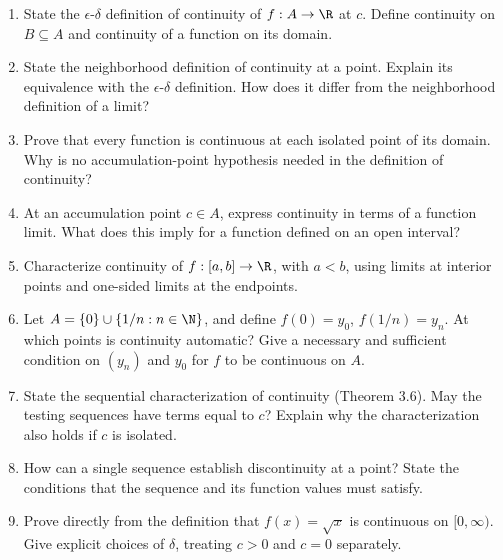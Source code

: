 \begin{enumerate}
  \item State the \(\epsilon\)-\(\delta\) definition of continuity
    of \(f:A\to\R\) at \(c\). Define continuity on \(B\subseteq A\)
    and continuity of a function on its domain.

  \item State the neighborhood definition of continuity at a point.
    Explain its equivalence with the \(\epsilon\)-\(\delta\) definition.
    How does it differ from the neighborhood definition of a limit?

  \item Prove that every function is continuous at each isolated point
    of its domain. Why is no accumulation-point hypothesis needed
    in the definition of continuity?

  \item At an accumulation point \(c\in A\), express continuity in
    terms of a function limit. What does this imply for a function
    defined on an open interval?

  \item Characterize continuity of \(f:[a,b]\to\R\), with \(a<b\),
    using limits at interior points and one-sided limits at the endpoints.

  \item Let \(A=\{0\}\cup\{1/n:n\in\N\}\), and define
    \(f(0)=y_0\), \(f(1/n)=y_n\). At which points is continuity
    automatic? Give a necessary and sufficient condition on \((y_n)\)
    and \(y_0\) for \(f\) to be continuous on \(A\).

  \item State the sequential characterization of continuity
    (Theorem 3.6). May the testing sequences have terms equal to \(c\)?
    Explain why the characterization also holds if \(c\) is isolated.

  \item How can a single sequence establish discontinuity at a point?
    State the conditions that the sequence and its function values
    must satisfy.

  \item Prove directly from the definition that \(f(x)=\sqrt{x}\)
    is continuous on \([0,\infty)\). Give explicit choices of
    \(\delta\), treating \(c>0\) and \(c=0\) separately.


\end{enumerate}
